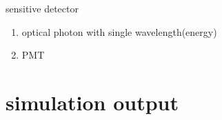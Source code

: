 \documentclass[11pt,compress,xcolor=x11names,UTF8]{beamer}
\begin{document}
\begin{frame}{sensitive detector}
\begin{enumerate}
	\item optical photon with single wavelength(energy)
	\item PMT
\end{enumerate}
\end{frame}
\section{simulation output }
\end{document}
